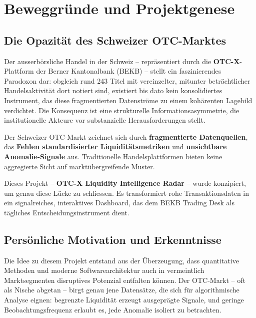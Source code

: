\documentclass[12pt, a4paper, oneside]{report}
\newcommand{\term}[1]{\textcolor{swissred}{\textsf{\textbf{#1}}}}
\begin{document}
\tableofcontents
\newpage

\chapter{Beweggründe und Projektgenese}

\section{Die Opazität des Schweizer OTC-Marktes}

Der ausserbörsliche Handel in der Schweiz -- repräsentiert durch die \term{OTC-X}-Plattform der Berner Kantonalbank (BEKB) -- stellt ein faszinierendes Paradoxon dar: obgleich rund 243 Titel mit vereinzelter, mitunter beträchtlicher Handelsaktivität dort notiert sind, existiert bis dato kein konsolidiertes Instrument, das diese fragmentierten Datenströme zu einem kohärenten Lagebild verdichtet. Die Konsequenz ist eine strukturelle Informationsasymmetrie, die institutionelle Akteure vor substanzielle Herausforderungen stellt.

\begin{infobox}[Problemstellung]
Der Schweizer OTC-Markt zeichnet sich durch \textbf{fragmentierte Datenquellen}, das \textbf{Fehlen standardisierter Liquiditätsmetriken} und \textbf{unsichtbare Anomalie-Signale} aus. Traditionelle Handelsplattformen bieten keine aggregierte Sicht auf marktübergreifende Muster.
\end{infobox}

Dieses Projekt -- \textbf{OTC-X Liquidity Intelligence Radar} -- wurde konzipiert, um genau diese Lücke zu schliessen. Es transformiert rohe Transaktionsdaten in ein signalreiches, interaktives Dashboard, das dem BEKB Trading Desk als tägliches Entscheidungsinstrument dient.

\section{Persönliche Motivation und Erkenntnisse}

Die Idee zu diesem Projekt entstand aus der Überzeugung, dass quantitative Methoden und moderne Softwarearchitektur auch in vermeintlich  Marktsegmenten disruptives Potenzial entfalten können. Der OTC-Markt -- oft als Nische abgetan -- birgt genau jene Datensätze, die sich für algorithmische Analyse eignen: begrenzte Liquidität erzeugt ausgeprägte Signale, und geringe Beobachtungsfrequenz erlaubt es, jede Anomalie isoliert zu betrachten.
\end{document}

